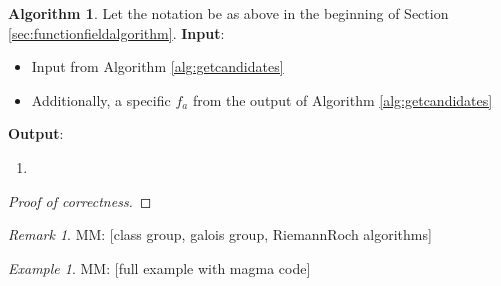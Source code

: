 \documentclass{dcthesis}
\newcommand{\defi}[1]{\textsf{#1}}
\newcommand{\mm}[1]{{\color{blue} \sf MM: [#1]}}
\numberwithin{equation}{section}
\theoremstyle{definition}
\newtheorem{definition}[equation]{Definition}
\newtheorem{alg}[equation]{Algorithm}
\theoremstyle{remark}
\newtheorem{remark}[equation]{Remark}
\newtheorem{example}[equation]{Example}
\begin{document}
{{    \begin{alg}
      \label{alg:extractroot}
      Let the notation be
      as above in the beginning of
      Section
      \ref{sec:functionfieldalgorithm}.
      \newline
      \textbf{Input}:
      \begin{itemize}
        \item
          Input from
          Algorithm
          \ref{alg:getcandidates}
        \item
          Additionally,
          a specific
          $f_a$ from the output of
          Algorithm
          \ref{alg:getcandidates}
      \end{itemize}
      \textbf{Output}:
      \begin{enumerate}
        \item 
      \end{enumerate}
    \end{alg}
    \begin{proof}[Proof of correctness]
    \end{proof}
    \begin{remark}
      \label{rmk:computationalremarks}
      \mm{class group, galois group,
      RiemannRoch algorithms}
    \end{remark}
    \begin{example}
      \label{exm:equationsinmagma}
      \mm{full example with magma code}
    \end{example}
  }
}
\end{document}
